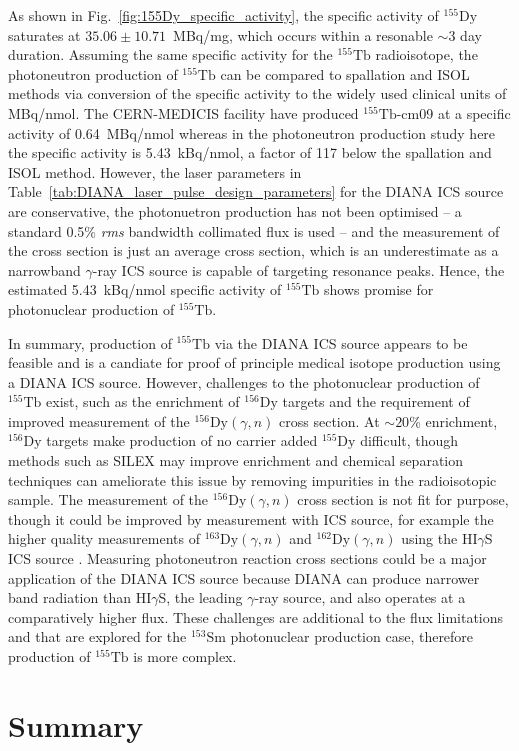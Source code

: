\documentclass[../main.tex]{subfiles}
\begin{document}
As shown in Fig.~\ref{fig:155Dy_specific_activity}, the specific activity of $^{155}\mathrm{Dy}$ saturates at $35.06\pm 10.71$~\si{\mega\becquerel}/\si{\milli\gram}, which occurs within a resonable $\sim$3 day duration. Assuming the same specific activity for the $^{155}\mathrm{Tb}$ radioisotope, the photoneutron production of $^{155}\mathrm{Tb}$ can be compared to spallation and ISOL methods via conversion of the specific activity to the widely used clinical units of
\si{\mega\becquerel}/\si{\nano\mole}. The CERN-MEDICIS facility have produced $^{155}\mathrm{Tb}$-cm09 at a specific activity of 0.64~\si{\mega\becquerel}/\si{\nano\mole} \cite{muller2012unique} whereas in the photoneutron production study here the specific activity is 5.43~\si{\kilo\becquerel}/\si{\nano\mole}, a factor of 117 below the spallation and ISOL method. However, the laser parameters in Table~\ref{tab:DIANA_laser_pulse_design_parameters} for the DIANA ICS source are conservative, the photonuetron production has not been optimised -- a standard 0.5\% \textit{rms} bandwidth collimated flux is used -- and the measurement of the cross section is just an average cross section, which is an underestimate as a narrowband $\gamma$-ray ICS source is capable of targeting resonance peaks. Hence, the estimated 5.43~\si{\kilo\becquerel}/\si{\nano\mole} specific activity of $^{155}\mathrm{Tb}$ shows promise for photonuclear production of $^{155}\mathrm{Tb}$.

In summary, production of $^{155}\mathrm{Tb}$ via the DIANA ICS source appears to be feasible and is a candiate for proof of principle medical isotope production using a DIANA ICS source. However, challenges to the photonuclear production of $^{155}\mathrm{Tb}$ exist, such as the enrichment of $^{156}\mathrm{Dy}$ targets and the requirement of improved measurement of the $^{156}\mathrm{Dy}\left(\gamma,n\right)$ cross section. At $\sim20$\% enrichment, $^{156}\mathrm{Dy}$ targets make production of no carrier added $^{155}\mathrm{Dy}$ difficult, though methods such as SILEX \cite{} may improve enrichment and chemical separation techniques \cite{webster2019chemical} can ameliorate this issue by removing impurities in the radioisotopic sample. The measurement of the $^{156}\mathrm{Dy}\left(\gamma,n\right)$ cross section is not fit for purpose, though it could be improved by measurement with ICS source, for example the higher quality measurements of $^{163}\mathrm{Dy}\left(\gamma,n\right)$ and $^{162}\mathrm{Dy}\left(\gamma,n\right)$ using the HI$\gamma$S ICS source \cite{renstrom2018verification}. Measuring photoneutron reaction cross sections could be a major application of the DIANA ICS source because DIANA can produce narrower band radiation than HI$\gamma$S, the leading $\gamma$-ray source, and also operates at a comparatively higher flux. These challenges are additional to the flux limitations and that are explored for the $^{153}\mathrm{Sm}$ photonuclear production case, therefore production of $^{155}\mathrm{Tb}$ is more complex.  

\section{Summary}
\end{document}
